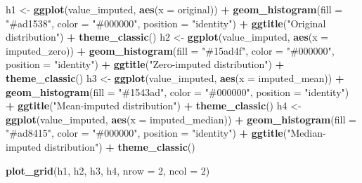 \documentclass[
]{article}
\newenvironment{Shaded}{\begin{snugshade}}{\end{snugshade}}
\newcommand{\AttributeTok}[1]{\textcolor[rgb]{0.13,0.29,0.53}{#1}}
\newcommand{\DecValTok}[1]{\textcolor[rgb]{0.00,0.00,0.81}{#1}}
\newcommand{\FunctionTok}[1]{\textcolor[rgb]{0.13,0.29,0.53}{\textbf{#1}}}
\newcommand{\NormalTok}[1]{#1}
\newcommand{\OtherTok}[1]{\textcolor[rgb]{0.56,0.35,0.01}{#1}}
\newcommand{\SpecialCharTok}[1]{\textcolor[rgb]{0.81,0.36,0.00}{\textbf{#1}}}
\newcommand{\StringTok}[1]{\textcolor[rgb]{0.31,0.60,0.02}{#1}}
\begin{document}
\begin{Shaded}
\begin{Highlighting}[]
\NormalTok{h1 }\OtherTok{\textless{}{-}} \FunctionTok{ggplot}\NormalTok{(value\_imputed, }\FunctionTok{aes}\NormalTok{(}\AttributeTok{x =}\NormalTok{ original)) }\SpecialCharTok{+}
  \FunctionTok{geom\_histogram}\NormalTok{(}\AttributeTok{fill =} \StringTok{"\#ad1538"}\NormalTok{, }\AttributeTok{color =} \StringTok{"\#000000"}\NormalTok{, }\AttributeTok{position =} \StringTok{"identity"}\NormalTok{) }\SpecialCharTok{+}
  \FunctionTok{ggtitle}\NormalTok{(}\StringTok{"Original distribution"}\NormalTok{) }\SpecialCharTok{+}
  \FunctionTok{theme\_classic}\NormalTok{()}
\NormalTok{h2 }\OtherTok{\textless{}{-}} \FunctionTok{ggplot}\NormalTok{(value\_imputed, }\FunctionTok{aes}\NormalTok{(}\AttributeTok{x =}\NormalTok{ imputed\_zero)) }\SpecialCharTok{+}
  \FunctionTok{geom\_histogram}\NormalTok{(}\AttributeTok{fill =} \StringTok{"\#15ad4f"}\NormalTok{, }\AttributeTok{color =} \StringTok{"\#000000"}\NormalTok{, }\AttributeTok{position =} \StringTok{"identity"}\NormalTok{) }\SpecialCharTok{+}
  \FunctionTok{ggtitle}\NormalTok{(}\StringTok{"Zero{-}imputed distribution"}\NormalTok{) }\SpecialCharTok{+}
  \FunctionTok{theme\_classic}\NormalTok{()}
\NormalTok{h3 }\OtherTok{\textless{}{-}} \FunctionTok{ggplot}\NormalTok{(value\_imputed, }\FunctionTok{aes}\NormalTok{(}\AttributeTok{x =}\NormalTok{ imputed\_mean)) }\SpecialCharTok{+}
  \FunctionTok{geom\_histogram}\NormalTok{(}\AttributeTok{fill =} \StringTok{"\#1543ad"}\NormalTok{, }\AttributeTok{color =} \StringTok{"\#000000"}\NormalTok{, }\AttributeTok{position =} \StringTok{"identity"}\NormalTok{) }\SpecialCharTok{+}
  \FunctionTok{ggtitle}\NormalTok{(}\StringTok{"Mean{-}imputed distribution"}\NormalTok{) }\SpecialCharTok{+}
  \FunctionTok{theme\_classic}\NormalTok{()}
\NormalTok{h4 }\OtherTok{\textless{}{-}} \FunctionTok{ggplot}\NormalTok{(value\_imputed, }\FunctionTok{aes}\NormalTok{(}\AttributeTok{x =}\NormalTok{ imputed\_median)) }\SpecialCharTok{+}
  \FunctionTok{geom\_histogram}\NormalTok{(}\AttributeTok{fill =} \StringTok{"\#ad8415"}\NormalTok{, }\AttributeTok{color =} \StringTok{"\#000000"}\NormalTok{, }\AttributeTok{position =} \StringTok{"identity"}\NormalTok{) }\SpecialCharTok{+}
  \FunctionTok{ggtitle}\NormalTok{(}\StringTok{"Median{-}imputed distribution"}\NormalTok{) }\SpecialCharTok{+}
  \FunctionTok{theme\_classic}\NormalTok{()}

\FunctionTok{plot\_grid}\NormalTok{(h1, h2, h3, h4, }\AttributeTok{nrow =} \DecValTok{2}\NormalTok{, }\AttributeTok{ncol =} \DecValTok{2}\NormalTok{)}
\end{Highlighting}
\end{Shaded}
\end{document}
